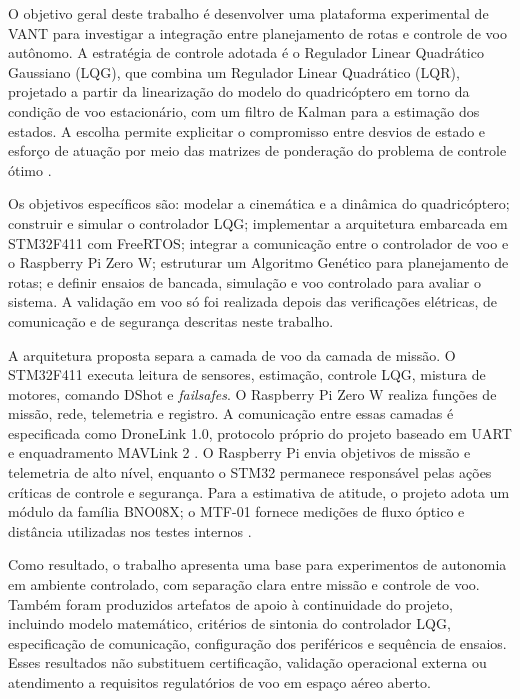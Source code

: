 O objetivo geral deste trabalho é desenvolver uma plataforma experimental de VANT para investigar a integração entre planejamento de rotas e controle de voo autônomo. A estratégia de controle adotada é o Regulador Linear Quadrático Gaussiano (LQG), que combina um Regulador Linear Quadrático (LQR), projetado a partir da linearização do modelo do quadricóptero em torno da condição de voo estacionário, com um filtro de Kalman para a estimação dos estados. A escolha permite explicitar o compromisso entre desvios de estado e esforço de atuação por meio das matrizes de ponderação do problema de controle ótimo \cite{jafari2010,okyere2019}.

Os objetivos específicos são: modelar a cinemática e a dinâmica do quadricóptero; construir e simular o controlador LQG; implementar a arquitetura embarcada em STM32F411 com FreeRTOS; integrar a comunicação entre o controlador de voo e o Raspberry Pi Zero W; estruturar um Algoritmo Genético para planejamento de rotas; e definir ensaios de bancada, simulação e voo controlado para avaliar o sistema. A validação em voo só foi realizada depois das verificações elétricas, de comunicação e de segurança descritas neste trabalho.

A arquitetura proposta separa a camada de voo da camada de missão. O STM32F411 executa leitura de sensores, estimação, controle LQG, mistura de motores, comando DShot e \textit{failsafes}. O Raspberry Pi Zero W realiza funções de missão, rede, telemetria e registro. A comunicação entre essas camadas é especificada como DroneLink 1.0, protocolo próprio do projeto baseado em UART e enquadramento MAVLink 2 \cite{koubaa2019,mavlinkguide}. O Raspberry Pi envia objetivos de missão e telemetria de alto nível, enquanto o STM32 permanece responsável pelas ações críticas de controle e segurança. Para a estimativa de atitude, o projeto adota um módulo da família BNO08X; o MTF-01 fornece medições de fluxo óptico e distância utilizadas nos testes internos \cite{bno08xdatasheet,micoair2024}.

Como resultado, o trabalho apresenta uma base para experimentos de autonomia em ambiente controlado, com separação clara entre missão e controle de voo. Também foram produzidos artefatos de apoio à continuidade do projeto, incluindo modelo matemático, critérios de sintonia do controlador LQG, especificação de comunicação, configuração dos periféricos e sequência de ensaios. Esses resultados não substituem certificação, validação operacional externa ou atendimento a requisitos regulatórios de voo em espaço aéreo aberto.

